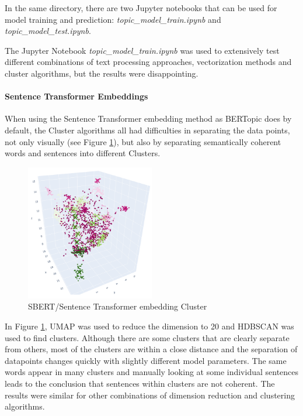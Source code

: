 In the same directory, there are two Jupyter notebooks that can be used for model training and prediction:
\emph{topic\_model\_train.ipynb} and \emph{topic\_model\_test.ipynb}.

The Jupyter Notebook \emph{topic\_model\_train.ipynb} was used to extensively test different combinations of text processing approaches, vectorization methods and
cluster algorithms, but the results were disappointing.

\paragraph{Sentence Transformer Embeddings}
When using the Sentence Transformer embedding method as BERTopic does by default, the Cluster algorithms all had difficulties in separating the data points, not
only visually (see Figure \ref{fig:topic-embedd-cluster}), but also by separating semantically coherent words and sentences into different Clusters.

\begin{figure}[H]   %
    \centering
    \includegraphics[width=0.50\textwidth]{Assets/topic-embedd-cluster}
    \caption{SBERT/Sentence Transformer embedding Cluster}
    \label{fig:topic-embedd-cluster}
\end{figure}

In Figure \ref{fig:topic-embedd-cluster}, UMAP was used to reduce the dimension to 20 and HDBSCAN was used to find clusters.
Although there are some clusters that are clearly separate from others, most of the clusters are within a close distance and the
separation of datapoints changes quickly with slightly different model parameters.
The same words appear in many clusters and manually looking at some individual sentences leads to the conclusion that sentences within clusters are not coherent.
The results were similar for other combinations of dimension reduction and clustering algorithms.


